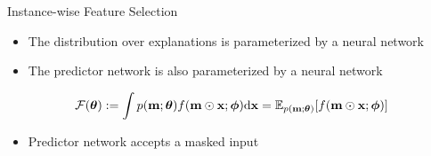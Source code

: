 \documentclass[11pt,compress,t,notes=noshow, aspectratio=169, xcolor=table]{beamer}
\begin{document}
	
\begin{frame}{Instance-wise Feature Selection}
\begin{itemize}
    \item The distribution over explanations is parameterized by a neural network
    \item The predictor network is also parameterized by a neural network
\end{itemize}
\bigskip
\begin{equation*}
             \centering
    \mathcal{F}(\boldsymbol{\theta}):=\int p(\mathbf{m} ; \boldsymbol{\theta}) f(\mathbf{m} \odot \mathbf{x} ; \boldsymbol{\phi}) \mathrm{d} \mathbf{x}=\mathbb{E}_{p(\mathbf{m} ; \boldsymbol{\theta})}[f(\mathbf{m} \odot \mathbf{x} ; \boldsymbol{\phi})]
\end{equation*}

\bigskip

\begin{itemize}
    \item Predictor network accepts a masked input
\end{itemize}
\end{frame}
\end{document}
